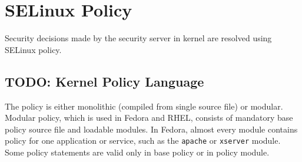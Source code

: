 \section{SELinux Policy}

Security decisions made by the security server in kernel are resolved using
SELinux policy.

\subsection{TODO: Kernel Policy Language}

The policy is either monolithic (compiled from single source file) or modular.
Modular policy, which is used in Fedora and RHEL, consists of mandatory base
policy source file and loadable modules. In Fedora, almost every module contains
policy for one application or service, such as the \texttt{apache} or
\texttt{xserver} module. Some policy statements are valid only in base policy or
in policy module.

